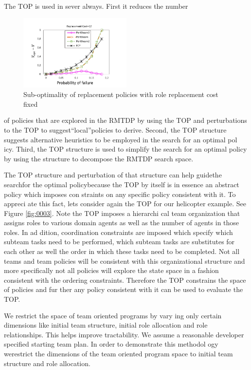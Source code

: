 \documentclass{IEEEtran}
\begin{document}
  The TOP is used in sever always. First it reduces the number
\begin{figure}[htb]
        \centering
        \includegraphics[width=0.5\textwidth]{figure0005.pdf}
        \caption{ Sub-optimality of replacement policies with role
        replacement cost fixed}
        \label{fig:0005}
        \end{figure}
of policies that are explored in the RMTDP by using the
 TOP and perturbations to the TOP to suggest“local”policies
 to derive. Second, the TOP structure suggests alternative
 heuristics to be employed in the search for an optimal pol
icy. Third, the TOP structure is used to simplify the search
 for an optimal policy by using the structure to decompose
 the RMTDP search space.

  The TOP structure and perturbation of that structure can
 help guidethe searchfor the optimal policybecause the TOP
 by itself is in essence an abstract policy which imposes con
straints on any specific policy consistent with it. To appreci
ate this fact, lets consider again the TOP for our helicopter
 example. See Figure \ref{fig:0003}. Note the TOP imposes a hierarchi
cal team organization that assigns roles to various domain
 agents as well as the number of agents in those roles. In ad
dition, coordination constraints are imposed which specify
 which subteam tasks need to be performed, which subteam
 tasks are substitutes for each other as well the order in which
 these tasks need to be completed. Not all teams and team
 policies will be consistent with this organizational structure
 and more specifically not all policies will explore the state
 space in a fashion consistent with the ordering constraints.
 Therefore the TOP constrains the space of policies and fur
ther any policy consistent with it can be used to evaluate the
 TOP.

  We restrict the space of team oriented programs by vary
ing only certain dimensions like initial team structure, initial
 role allocation and role relationships. This helps improve
 tractability. We assume a reasonable developer specified
 starting team plan. In order to demonstrate this methodol
ogy werestrict the dimensions of the team oriented program
 space to initial team structure and role allocation.
\end{document}

